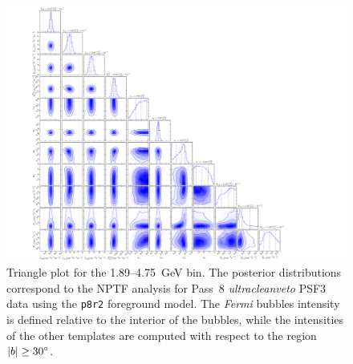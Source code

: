 \begin{figure}[p] %
   \centering
   \includegraphics[trim={2cm 0 6cm 0},clip,width=\textwidth]{ch-igrb/plots/triangle_plot_8_12.pdf} 
   \caption{Triangle plot for the 1.89--4.75~GeV bin.  The posterior distributions correspond to the NPTF analysis for Pass~8 {\it ultracleanveto} PSF3 data using the \texttt{p8r2} foreground model.  The \emph{Fermi} bubbles intensity is defined relative to the interior of the bubbles, while the intensities of the other templates are computed with respect to the region $\left\lvert b \right\rvert \geq 30^\circ$. }  
   \label{fig:p8triangle1} 
\end{figure}


